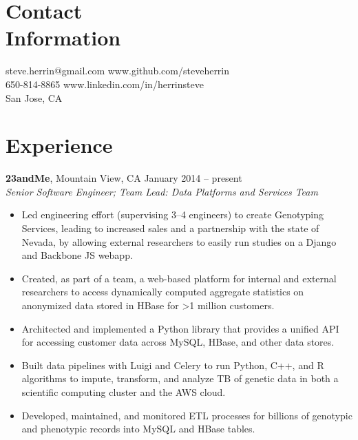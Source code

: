 \documentclass[margin,line]{resume}
\begin{document}
\begin{resume}

    \section{\mysidestyle Contact\\Information}

    steve.herrin@gmail.com		\hfill www.github.com/steveherrin		\vspace{0mm}\\\vspace{0mm}%
    650-814-8865				\hfill www.linkedin.com/in/herrinsteve	\vspace{0mm}\\\vspace{-4.5mm}%
    San Jose, CA    			\hfill				    				\vspace{0mm}\\\vspace{0mm}%
    
    \section{\mysidestyle Experience}

    \textbf{23andMe}, Mountain View, CA \hfill January 2014 -- present\vspace{1mm}\\\vspace{1mm}%
    \textsl{Senior Software Engineer; Team Lead: Data Platforms and Services Team}
    \begin{itemize}
    \item Led engineering effort (supervising 3--4 engineers) to create Genotyping Services, leading to increased sales and a partnership with the state of Nevada, by allowing external researchers to easily run studies on a Django and Backbone JS webapp.
    \item Created, as part of a team, a web-based platform for internal and external researchers to access dynamically computed aggregate statistics on anonymized data stored in HBase for \textgreater 1 million customers.
    \item Architected and implemented a Python library that provides a unified API for accessing customer data across MySQL, HBase, and other data stores.
    \item Built data pipelines with Luigi and Celery to run Python, C++, and R algorithms to impute, transform, and analyze TB of genetic data in both a scientific computing cluster and the AWS cloud.
    \item Developed, maintained, and monitored ETL processes for billions of genotypic and phenotypic records into MySQL and HBase tables.
    \end{itemize}
    

\end{resume}
\end{document}
